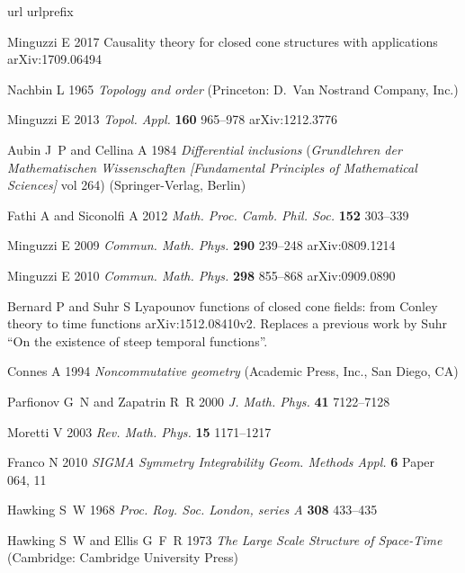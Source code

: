 \documentclass[a4paper]{jpconf}
\theoremstyle{definition}
\theoremstyle{remark}
\begin{document}
\providecommand{\newblock}{}
\begin{thebibliography}{10}
\expandafter\ifx\csname url\endcsname\relax
  \def\url#1{{\tt #1}}\fi
\expandafter\ifx\csname urlprefix\endcsname\relax\def\urlprefix{URL }\fi
\providecommand{\eprint}[2][]{\url{#2}}

Minguzzi E 2017 Causality theory for closed cone structures with applications
  arXiv:1709.06494

Nachbin L 1965 {\em Topology and order\/} (Princeton: D.\ {V}an {N}ostrand
  {C}ompany, {I}nc.)

Minguzzi E 2013 {\em Topol. Appl.\/} {\bf 160} 965--978 {arXiv}:1212.3776

Aubin J~P and Cellina A 1984 {\em Differential inclusions\/} ({\em Grundlehren
  der Mathematischen Wissenschaften [Fundamental Principles of Mathematical
  Sciences]\/} vol 264) (Springer-Verlag, Berlin)

Fathi A and Siconolfi A 2012 {\em Math. {P}roc. {C}amb. {P}hil. {S}oc.\/} {\bf
  152} 303--339

Minguzzi E 2009 {\em Commun. Math. Phys.\/} {\bf 290} 239--248
  {arXiv}:0809.1214

Minguzzi E 2010 {\em Commun. Math. Phys.\/} {\bf 298} 855--868
  {arXiv}:0909.0890

Bernard P and Suhr S Lyapounov functions of closed cone fields: from {C}onley
  theory to time functions {arXiv}:1512.08410v2. Replaces a previous
   work by Suhr ``On the existence of steep temporal functions''.

Connes A 1994 {\em Noncommutative geometry\/} (Academic Press, Inc., San Diego,
  CA)

Parfionov G~N and Zapatrin R~R 2000 {\em J. Math. Phys.\/} {\bf 41} 7122--7128

Moretti V 2003 {\em Rev. Math. Phys.\/} {\bf 15} 1171--1217

Franco N 2010 {\em SIGMA Symmetry Integrability Geom. Methods Appl.\/} {\bf 6}
  Paper 064, 11

Hawking S~W 1968 {\em Proc. {R}oy. {S}oc. {L}ondon, series {A}\/} {\bf 308}
  433--435

Hawking S~W and Ellis G~F~R 1973 {\em The Large Scale Structure of
  Space-Time\/} (Cambridge: Cambridge {U}niversity {P}ress)


\end{thebibliography}
\end{document}
